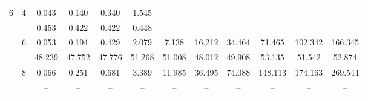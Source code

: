 \documentclass{amsart}
\theoremstyle{definition}
\begin{document}
\begin{table}[ht]
{\begin{tabular}{|c|c|cccccccccc|}
\multirow{6}{*}{6} & \multirow{2}{*}{4} & 0.043 & 0.140 & 0.340 & 1.545 &  &  &  &  &  & \\
					&				   & 0.453 & 0.422 & 0.422 & 0.448 &  &  &  &  &  & \\
				  & \multirow{2}{*}{6} & 0.053 & 0.194 & 0.429 & 2.079 & 7.138 & 16.212 & 34.464 & 71.465 & 102.342 & 166.345 \\
				    	&				   & 48.239 & 47.752 & 47.776 & 51.268 & 51.008 & 48.012 & 49.908 & 53.135 & 51.542 & 52.874 \\
				  & \multirow{2}{*}{8} & 0.066 & 0.251 & 0.681 & 3.389 & 11.985 & 36.495 & 74.088 & 148.113 & 174.163 & 269.544 \\
				    	&				   & -- & -- & -- & -- & -- & -- & -- & -- & -- & -- \\
\hline
\end{tabular}}
\end{table}
\end{document}
